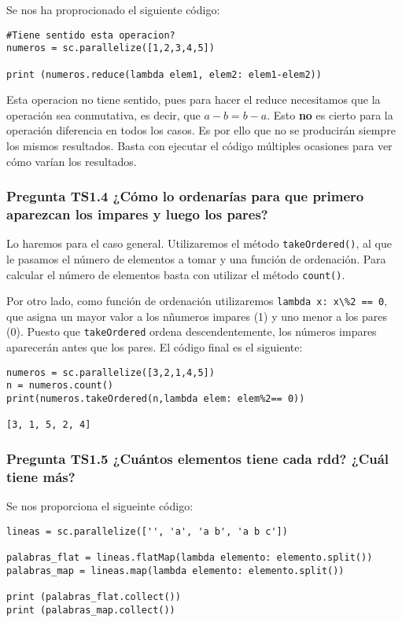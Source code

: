 \documentclass[11pt]{article}
\def\inline{\lstinline[basicstyle=\ttfamily,keywordstyle={}]}
\begin{document}
Se nos ha proprocionado el siguiente código:

\begin{verbatim}
#Tiene sentido esta operacion?
numeros = sc.parallelize([1,2,3,4,5])

print (numeros.reduce(lambda elem1, elem2: elem1-elem2))
\end{verbatim}

Esta operacion no tiene sentido, pues para hacer el reduce necesitamos que la operación sea conmutativa, es decir, que $a-b = b-a$. Esto \textbf{no} es cierto para la operación diferencia en todos los casos. Es por ello que no se producirán siempre los mismos resultados. Basta con ejecutar el código múltiples ocasiones para ver cómo varían los resultados.

\subsubsection*{ Pregunta TS1.4 ¿Cómo lo ordenarías para que primero aparezcan los impares y luego los pares?}

Lo haremos para el caso general. Utilizaremos el método \inline{takeOrdered()}, al que le pasamos el número de elementos a tomar y una función de ordenación. Para calcular el número de elementos basta con utilizar el método \inline{count()}.

Por otro lado, como función de ordenación utilizaremos \inline{lambda x: x\%2 == 0}, que asigna un mayor valor a los nñumeros impares (1) y uno menor a los pares (0). Puesto que \inline{takeOrdered} ordena descendentemente, los números impares aparecerán antes que los pares. El código final es el siguiente:

\begin{verbatim}
numeros = sc.parallelize([3,2,1,4,5])
n = numeros.count()
print(numeros.takeOrdered(n,lambda elem: elem%2== 0))

[3, 1, 5, 2, 4]
\end{verbatim}

\subsubsection*{ Pregunta TS1.5 ¿Cuántos elementos tiene cada rdd? ¿Cuál tiene más? }

Se nos proporciona el sigueinte código:

\begin{verbatim}
lineas = sc.parallelize(['', 'a', 'a b', 'a b c'])

palabras_flat = lineas.flatMap(lambda elemento: elemento.split())
palabras_map = lineas.map(lambda elemento: elemento.split())

print (palabras_flat.collect())
print (palabras_map.collect())
\end{verbatim}
\end{document}
